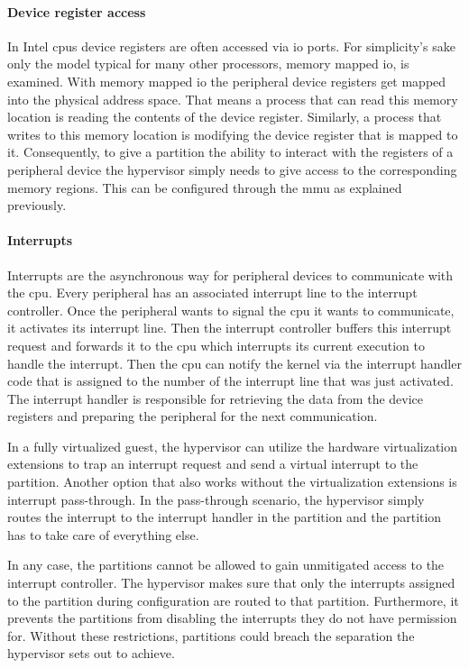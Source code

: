 \paragraph{Device register access}
In Intel \acrshort{cpu}s device registers are often accessed via \acrshort{io} ports. For simplicity's sake only the model typical for many other processors, memory mapped \acrshort{io}, is examined. With memory mapped \acrshort{io} the peripheral device registers get mapped into the physical address space. That means a process that can read this memory location is reading the contents of the device register. Similarly, a process that writes to this memory location is modifying the device register that is mapped to it. Consequently, to give a partition the ability to interact with the registers of a peripheral device the hypervisor simply needs to give access to the corresponding memory regions. This can be configured through the \acrshort{mmu} as explained previously.

\paragraph{Interrupts}
Interrupts are the asynchronous way for peripheral devices to communicate with the \acrshort{cpu}. Every peripheral has an associated interrupt line to the interrupt controller. Once the peripheral wants to signal the \acrshort{cpu} it wants to communicate, it activates its interrupt line. Then the interrupt controller buffers this interrupt request and forwards it to the \acrshort{cpu} which interrupts its current execution to handle the interrupt. Then the \acrshort{cpu} can notify the kernel via the interrupt handler code that is assigned to the number of the interrupt line that was just activated. The interrupt handler is responsible for retrieving the data from the device registers and preparing the peripheral for the next communication.

In a fully virtualized guest, the hypervisor can utilize the hardware virtualization extensions to trap an interrupt request and send a virtual interrupt to the partition. Another option that also works without the virtualization extensions is interrupt pass-through. In the pass-through scenario, the hypervisor simply routes the interrupt to the interrupt handler in the partition and the partition has to take care of everything else.

In any case, the partitions cannot be allowed to gain unmitigated access to the interrupt controller. The hypervisor makes sure that only the interrupts assigned to the partition during configuration are routed to that partition. Furthermore, it prevents the partitions from disabling the interrupts they do not have permission for. Without these restrictions, partitions could breach the separation the hypervisor sets out to achieve.

